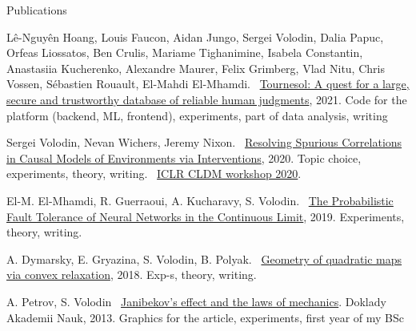 \documentclass{resume} %
\newcommand*{\mybold}[1]{{\color{gray} #1}}
\newcommand*{\logo}[1]{%
	\raisebox{-.02\baselineskip}{%
		\texttt{[image: ./img/\\imgpref\#1]}%
	}%
}
\def\imgpref{bleak-}
\newcommand{\mylink}{{\color{gray}\faExternalLink}}
\begin{document}
\vspace{-1em}
\begin{rSection}{Publications}
\vspace{-1em}
\item L\^{e}-Nguy\^{e}n Hoang, Louis Faucon, Aidan Jungo, \mybold{Sergei Volodin,} Dalia Papuc, Orfeas Liossatos, Ben Crulis, Mariame Tighanimine, Isabela Constantin, Anastasiia Kucherenko, Alexandre Maurer, Felix Grimberg, Vlad Nitu, Chris Vossen, Sébastien Rouault, El-Mahdi El-Mhamdi. \mylink~\href{https://arxiv.org/abs/2107.07334}{Tournesol: A quest for a large, secure and trustworthy database of reliable human judgments}, 2021. Code for the platform (backend, ML, frontend), experiments, part of data analysis, writing
\item \logo{iclr.png} \mybold{Sergei Volodin,} Nevan Wichers, Jeremy Nixon. \mylink~\href{https://arxiv.org/abs/2002.05217}{Resolving Spurious Correlations in Causal Models of Environments via Interventions}, 2020. Topic choice, experiments, theory, writing. \mylink~\href{https://causalrlworkshop.github.io/program/cldm_8.html}{ICLR CLDM workshop 2020}.
\item El-M. El-Mhamdi, R. Guerraoui, A. Kucharavy, \mybold{S. Volodin.} \mylink~\href{https://arxiv.org/abs/1902.01686}{The Probabilistic Fault Tolerance of Neural Networks in the Continuous Limit}, 2019. Experiments, theory,  writing. %
\item A. Dymarsky, E. Gryazina, \mybold{S. Volodin}, B. Polyak. \mylink~\href{https://arxiv.org/abs/1810.00896}{Geometry of quadratic maps via convex relaxation}, 2018. Exp-s, theory, writing.%
\item A. Petrov, \mybold{S. Volodin} \mylink~\href{https://sergeivolodin.github.io/other-projects/dj/PHDK349.pdf}{Janibekov's effect and the laws of mechanics}. Doklady Akademii Nauk, 2013. Graphics for the article, experiments, first year of my BSc
\end{rSection}
\end{document}
